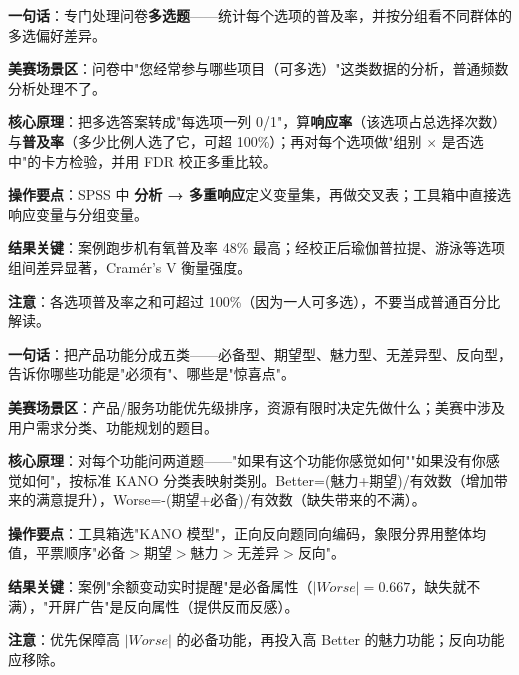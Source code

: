\begin{algobrief}
\textbf{一句话}：专门处理问卷\textbf{多选题}——统计每个选项的普及率，并按分组看不同群体的多选偏好差异。

\textbf{美赛场景区}：问卷中"您经常参与哪些项目（可多选）"这类数据的分析，普通频数分析处理不了。

\textbf{核心原理}：把多选答案转成"每选项一列 0/1"，算\textbf{响应率}（该选项占总选择次数）与\textbf{普及率}（多少比例人选了它，可超 100\%）；再对每个选项做"组别 $\times$ 是否选中"的卡方检验，并用 FDR 校正多重比较。

\textbf{操作要点}：SPSS 中 \textbf{分析 → 多重响应}定义变量集，再做交叉表；工具箱中直接选响应变量与分组变量。

\textbf{结果关键}：案例跑步机有氧普及率 48\% 最高；经校正后瑜伽普拉提、游泳等选项组间差异显著，Cramér's V 衡量强度。

\textbf{注意}：各选项普及率之和可超过 100\%（因为一人可多选），不要当成普通百分比解读。
\end{algobrief}


\begin{algobrief}
\textbf{一句话}：把产品功能分成五类——必备型、期望型、魅力型、无差异型、反向型，告诉你哪些功能是"必须有"、哪些是"惊喜点"。

\textbf{美赛场景区}：产品/服务功能优先级排序，资源有限时决定先做什么；美赛中涉及用户需求分类、功能规划的题目。

\textbf{核心原理}：对每个功能问两道题——"如果有这个功能你感觉如何""如果没有你感觉如何"，按标准 KANO 分类表映射类别。Better=(魅力+期望)/有效数（增加带来的满意提升），Worse=-(期望+必备)/有效数（缺失带来的不满）。

\textbf{操作要点}：工具箱选"KANO 模型"，正向反向题同向编码，象限分界用整体均值，平票顺序"必备$>$期望$>$魅力$>$无差异$>$反向"。

\textbf{结果关键}：案例"余额变动实时提醒"是必备属性（$|Worse|=0.667$，缺失就不满），"开屏广告"是反向属性（提供反而反感）。

\textbf{注意}：优先保障高 $|Worse|$ 的必备功能，再投入高 Better 的魅力功能；反向功能应移除。
\end{algobrief}


